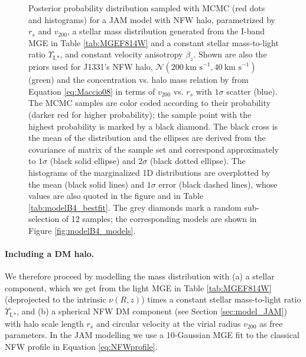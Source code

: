 \begin{figure}
\caption{Posterior probability distribution sampled with MCMC (red dots and histograms) for a JAM model with NFW halo, parametrized by $r_s$ and $v_\text{200}$, a stellar mass distribution generated from the I-band MGE in Table \ref{tab:MGEF814W} and a constant stellar mass-to-light ratio $\Upsilon_\text{I,*}$, and constant velocity anisotropy $\beta_z$. Shown are also the priors used for J1331's NFW halo, $\mathscr{N}(200~\text{km s}^{-1},40~\text{km s}^{-1})$ (green) and the concentration vs. halo mass relation by \citet{Maccio08} from Equation \eqref{eq:Maccio08} in terms of $v_{200}$ vs. $r_s$ with $1\sigma$ scatter (blue). The MCMC samples are color coded according to their probability (darker red for higher probability); the sample point with the highest probability is marked by a black diamond. The black cross is the mean of the distribution and the ellipses are derived from the covariance of matrix of the sample set and correspond approximately to $1\sigma$ (black solid ellipse) and $2\sigma$ (black dotted ellipse). The histograms of the marginalized 1D distributions are overplotted by the mean (black solid lines) and $1\sigma$ error (black dashed lines), whose values are also quoted in the figure and in Table \ref{tab:modelB4_bestfit}. The grey diamonds mark a random sub-selection of 12 samples; the corresponding models are shown in Figure \ref{fig:modelB4_models}. }
\label{fig:modelB4_triangle}
\end{figure}

\paragraph{Including a DM halo.} We therefore proceed by modelling the mass distribution with (a) a stellar component, which we get from the light MGE in Table \ref{tab:MGEF814W} (deprojected to the intrinsic $\nu(R,z)$) times a constant stellar mass-to-light ratio $\Upsilon_\text{I,*}$, and (b) a spherical NFW DM component (see Section \ref{sec:model_JAM}) with halo scale length $r_s$ and circular velocity at the virial radius $v_{200}$ as free parameters. In the JAM modelling we use a 10-Gaussian MGE fit to the classical NFW profile in Equation \eqref{eq:NFWprofile}.

